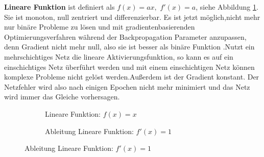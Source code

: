 \documentclass[12pt,a4paper]{scrartcl}
\numberwithin{equation}{section}
\begin{document}
\textbf{Lineare Funktion } ist definiert als $ f(x) = ax, $	$ f '(x) = a$, siehe Abbildung \ref{fig:Lineare Funktion}. Sie ist monoton, null zentriert und differenzierbar. Es ist jetzt möglich,nicht mehr nur binäre Probleme zu lösen und mit gradientenbasierenden Optimierungsverfahren während der Backpropagation Parameter anzupassen, denn Gradient nicht mehr null, also sie ist besser als binäre Funktion .Nutzt ein mehrschichtiges Netz die lineare Aktivierungsfunktion, so kann es auf ein einschichtiges Netz überführt werden und mit einem einschichtigen Netz können komplexe Probleme nicht gelöst werden.Außerdem ist der Gradient konstant. Der Netzfehler wird also nach einigen Epochen nicht mehr minimiert und das Netz wird immer das Gleiche vorhersagen.		
\begin{figure}[h]
	\caption{Lineare Funktion}
	\begin{subfigure}{.5\textwidth}
		\centering
		
		\caption{Lineare Funktion: $ f(x) = x $}
	\end{subfigure}%
	\begin{subfigure}{.5\textwidth}
		\centering
		\caption{Ableitung Lineare Funktion: $ f'(x) =1 $}
	\end{subfigure}
	\label{fig:Lineare Funktion}
	
\end{figure}
\end{document}
